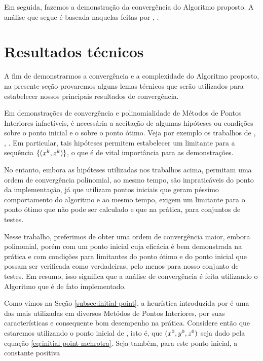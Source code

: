 Em seguida, fazemos a demonstração da convergência do Algoritmo proposto. A análise que segue é  baseada naquelas feitas por \textcite[cap. 6]{Wright:Primal-dual-interior-point:1997h},  \textcite{Zhang:2006ic,Zhang:1995fu}. 



\section{Resultados técnicos}



A fim de demonstrarmos a convergência e a complexidade do Algoritmo proposto, na presente seção provaremos alguns lemas técnicos que serão utilizados para estabelecer nossos principais resultados de convergência. 




Em demonstrações de convergência e polinomialidade de Métodos de Pontos Interiores  infactíveis, é  necessária a aceitação de algumas hipóteses ou condições sobre o ponto inicial e o sobre o ponto ótimo. Veja por exemplo os trabalhos de \textcite{Wright:1994jd}, \textcite[cap. 6]{Wright:Primal-dual-interior-point:1997h}, \textcite{Wright:1996kj,Zhang:2006ic,Zhang:1994fz,Zhang:1995fu}. Em particular, tais hipóteses permitem estabelecer um limitante para a sequência $\{(x^{k},z^{k})\}$, o que é de vital importância para as demonstrações.

No entanto, embora as hipóteses utilizadas nos trabalhos acima, permitam uma ordem de convergência  polinomial, ao mesmo tempo, são impraticáveis do ponto da implementação, já que utilizam pontos iniciais que geram péssimo comportamento do algoritmo e ao mesmo tempo, exigem um limitante para o ponto ótimo que não pode ser calculado e que na prática, para conjuntos de testes.

Nesse trabalho, preferimos de obter uma ordem de convergência maior, embora polinomial, porém com um ponto inicial cuja eficácia é bem demonstrada na prática e com  condições para limitantes  do ponto ótimo e do ponto inicial que possam ser verificada como verdadeiras, pelo menos para nosso conjunto de testes. Em resumo, isso significa que a análise de convergência é feita utilizando o Algoritmo que é de fato implementado.



Como vimos na Seção \ref{subsec:initial-point}, a heurística introduzida por \textcite{Mehrotra:1992wr} é uma das mais utilizadas em diversos Metódos de Pontos Interiores, por suas características e consequente bom desempenho na prática.
Considere então que estaremos utilizando o ponto inicial de \textcite{Mehrotra:1992wr}, isto é, que $(x^0 ,y^0,z^0 )$ seja dado pela equação \eqref{eq:initial-point-mehrotra}. Seja também, para este ponto inicial, a constante positiva

